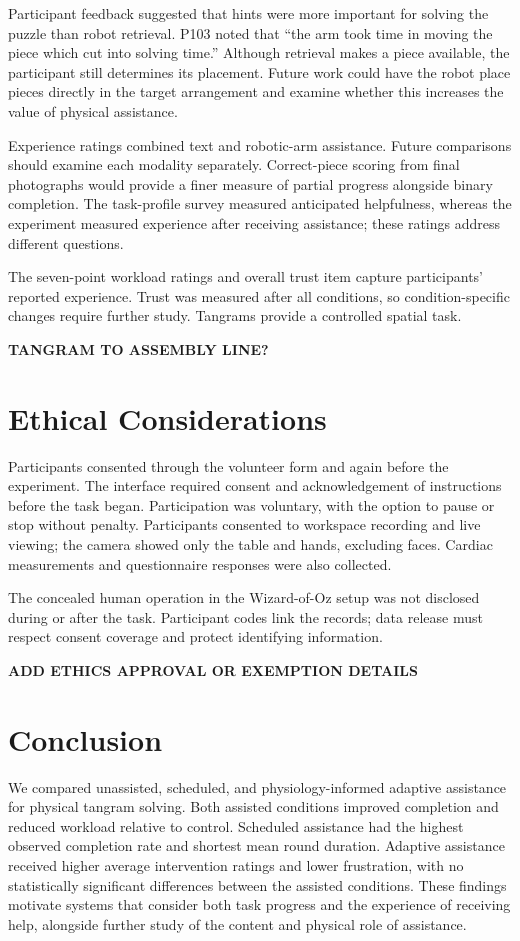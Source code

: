 \documentclass[sigconf,anonymous]{aamas}
\begin{document}
Participant feedback suggested that hints were more important for solving the puzzle than robot retrieval. P103 noted that ``the arm took time in moving the piece which cut into solving time.'' Although retrieval makes a piece available, the participant still determines its placement. Future work could have the robot place pieces directly in the target arrangement and examine whether this increases the value of physical assistance.

Experience ratings combined text and robotic-arm assistance. Future comparisons should examine each modality separately. Correct-piece scoring from final photographs would provide a finer measure of partial progress alongside binary completion. The task-profile survey measured anticipated helpfulness, whereas the experiment measured experience after receiving assistance; these ratings address different questions.

The seven-point workload ratings and overall trust item capture participants' reported experience. Trust was measured after all conditions, so condition-specific changes require further study. Tangrams provide a controlled spatial task.

\textbf{TANGRAM TO ASSEMBLY LINE?}

\section{Ethical Considerations}

Participants consented through the volunteer form and again before the experiment. The interface required consent and acknowledgement of instructions before the task began. Participation was voluntary, with the option to pause or stop without penalty. Participants consented to workspace recording and live viewing; the camera showed only the table and hands, excluding faces. Cardiac measurements and questionnaire responses were also collected.

The concealed human operation in the Wizard-of-Oz setup was not disclosed during or after the task. Participant codes link the records; data release must respect consent coverage and protect identifying information.

\textbf{ADD ETHICS APPROVAL OR EXEMPTION DETAILS}

\section{Conclusion}

We compared unassisted, scheduled, and physiology-informed adaptive assistance for physical tangram solving. Both assisted conditions improved completion and reduced workload relative to control. Scheduled assistance had the highest observed completion rate and shortest mean round duration. Adaptive assistance received higher average intervention ratings and lower frustration, with no statistically significant differences between the assisted conditions. These findings motivate systems that consider both task progress and the experience of receiving help, alongside further study of the content and physical role of assistance.
\end{document}
